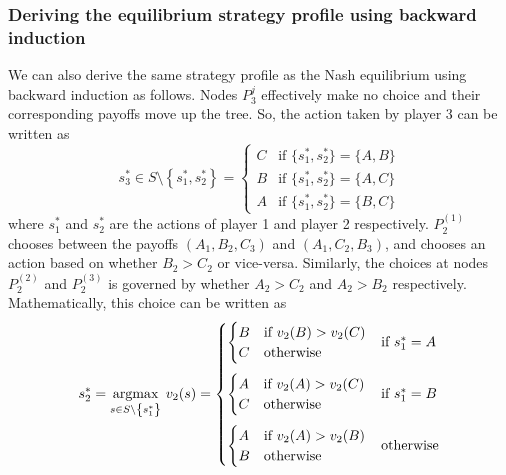 \documentclass[9pt]{article}
\begin{document}
\subsubsection*{Deriving the equilibrium strategy profile using backward induction}
We can also derive the same strategy profile as the Nash equilibrium using backward induction as follows.
Nodes $P_{3}^{j}$ effectively make no choice and their corresponding payoffs move up the tree.
So, the action taken by player 3 can be written as
\begin{equation}
    s_{3}^{*} \in S \setminus \left\{ s_{1}^{*}, s_{2}^{*} \right\} = \begin{cases}
        C & \text{if } \{ s_{1}^{*}, s_{2}^{*} \} = \{ A, B \} \\
        B & \text{if } \{ s_{1}^{*}, s_{2}^{*} \} = \{ A, C \} \\
        A & \text{if } \{ s_{1}^{*}, s_{2}^{*} \} = \{ B, C \}
    \end{cases}
\end{equation}
where $s_{1}^{*}$ and $s_{2}^{*}$ are the actions of player 1 and player 2 respectively.
$P_{2}^{(1)}$ chooses between the payoffs $(A_{1}, B_{2}, C_{3})$ and $(A_{1}, C_{2}, B_{3})$, and chooses an action based on whether $B_{2} > C_{2}$ or vice-versa.
Similarly, the choices at nodes $P_{2}^{(2)}$ and $P_{2}^{(3)}$ is governed by whether $A_{2} > C_{2}$ and $A_{2} > B_{2}$ respectively.
Mathematically, this choice can be written as
\begin{equation}
    s_{2}^{*} = \underset{s \in S \setminus \left\{ s_{1}^{*} \right\}}{\text{argmax}} \ v_{2}(s)
    = \begin{cases}
        \begin{cases}
            B & \text{if } v_{2}(B) > v_{2}(C) \\
            C & \text{otherwise} \\
        \end{cases} & \text{if } s_{1}^{*} = A
        \vspace*{7pt} \\
        \begin{cases}
            A & \text{if } v_{2}(A) > v_{2}(C) \\
            C & \text{otherwise} \\
        \end{cases} & \text{if } s_{1}^{*} = B
        \vspace*{7pt} \\
        \begin{cases}
            A & \text{if } v_{2}(A) > v_{2}(B) \\
            B & \text{otherwise} \\
        \end{cases} & \text{otherwise}
    \end{cases}
\end{equation}
\end{document}
